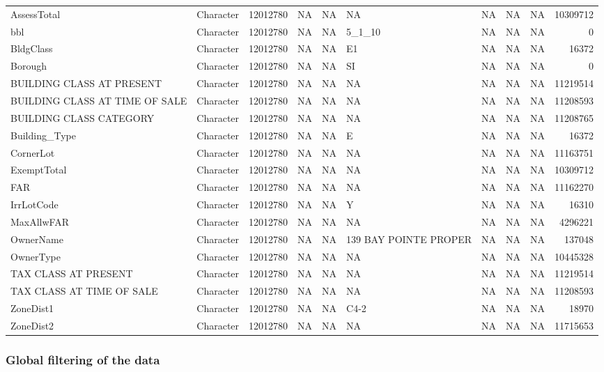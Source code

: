 \documentclass[12pt,]{article}
\begin{document}
\begin{table}
{\begin{tabular}[t]{llrrrlrrrr}
AssessTotal & Character & 12012780 & NA & NA & NA & NA & NA & NA & 10309712\\
\addlinespace
bbl & Character & 12012780 & NA & NA & 5\_1\_10 & NA & NA & NA & 0\\
BldgClass & Character & 12012780 & NA & NA & E1 & NA & NA & NA & 16372\\
Borough & Character & 12012780 & NA & NA & SI & NA & NA & NA & 0\\
BUILDING CLASS AT PRESENT & Character & 12012780 & NA & NA & NA & NA & NA & NA & 11219514\\
BUILDING CLASS AT TIME OF SALE & Character & 12012780 & NA & NA & NA & NA & NA & NA & 11208593\\
\addlinespace
BUILDING CLASS CATEGORY & Character & 12012780 & NA & NA & NA & NA & NA & NA & 11208765\\
Building\_Type & Character & 12012780 & NA & NA & E & NA & NA & NA & 16372\\
CornerLot & Character & 12012780 & NA & NA & NA & NA & NA & NA & 11163751\\
ExemptTotal & Character & 12012780 & NA & NA & NA & NA & NA & NA & 10309712\\
FAR & Character & 12012780 & NA & NA & NA & NA & NA & NA & 11162270\\
\addlinespace
IrrLotCode & Character & 12012780 & NA & NA & Y & NA & NA & NA & 16310\\
MaxAllwFAR & Character & 12012780 & NA & NA & NA & NA & NA & NA & 4296221\\
OwnerName & Character & 12012780 & NA & NA & 139 BAY POINTE PROPER & NA & NA & NA & 137048\\
OwnerType & Character & 12012780 & NA & NA & NA & NA & NA & NA & 10445328\\
TAX CLASS AT PRESENT & Character & 12012780 & NA & NA & NA & NA & NA & NA & 11219514\\
\addlinespace
TAX CLASS AT TIME OF SALE & Character & 12012780 & NA & NA & NA & NA & NA & NA & 11208593\\
ZoneDist1 & Character & 12012780 & NA & NA & C4-2 & NA & NA & NA & 18970\\
ZoneDist2 & Character & 12012780 & NA & NA & NA & NA & NA & NA & 11715653\\
\bottomrule
\end{tabular}}
\end{table}

\hypertarget{global-filtering-of-the-data}{%
\subsubsection{Global filtering of the
data}\label{global-filtering-of-the-data}}
\end{document}
